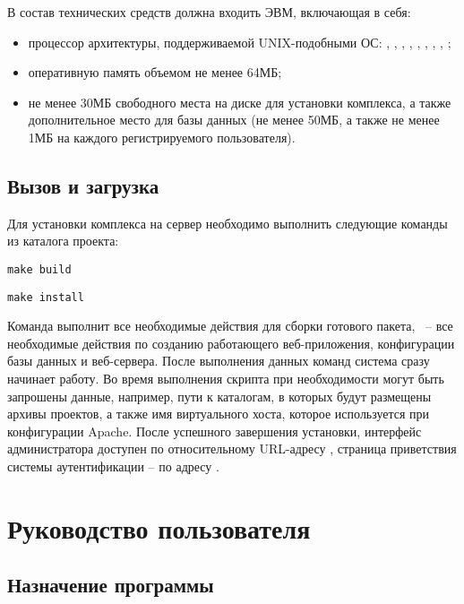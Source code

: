 В состав технических средств должна входить ЭВМ, включающая в себя:
\begin{itemize}
    \item процессор архитектуры, поддерживаемой UNIX-подобными ОС: , , , , , , , , ;
    \item оперативную память объемом не менее 64МБ;
    \item не менее 30МБ свободного места на диске для установки комплекса, а также дополнительное место для базы данных (не менее 50МБ, а также не менее 1МБ на каждого регистрируемого пользователя).
\end{itemize}

\subsection{Вызов и загрузка}

Для установки комплекса на сервер необходимо выполнить следующие команды из каталога проекта:

\begin{lscommand}\verb+make build+\end{lscommand}
\begin{lscommand}\verb+make install+\end{lscommand}

\noindent Команда  выполнит все необходимые действия для сборки готового пакета, ~-- все необходимые действия по созданию работающего веб-приложения, конфигурации базы данных и веб-сервера. После выполнения данных команд система сразу начинает работу. Во время выполнения скрипта при необходимости могут быть запрошены данные, например, пути к каталогам, в которых будут размещены архивы проектов, а также имя виртуального хоста, которое используется при конфигурации Apache. После успешного завершения установки, интерфейс администратора доступен по относительному URL-адресу , страница приветствия системы аутентификации -- по адресу .

\section{Руководство пользователя}
\label{sec:man}

\subsection{Назначение программы}

